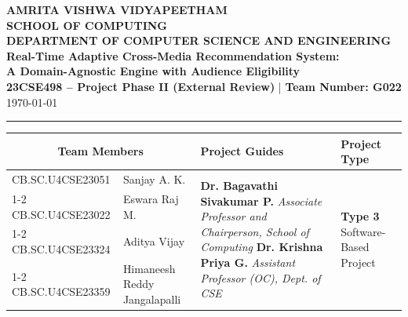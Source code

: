 \documentclass[11pt, a4paper]{article}
\begin{document}
\noindent
\begin{minipage}{\textwidth}
    \centering
    {\Large \textbf{\textcolor{amritaMaroon}{
    AMRITA VISHWA VIDYAPEETHAM \\
    SCHOOL OF COMPUTING \\
    DEPARTMENT OF COMPUTER SCIENCE AND ENGINEERING \\
    }}}
    \vspace{0.2cm}
    {\large \textbf{Real-Time Adaptive Cross-Media Recommendation System:\\ A Domain-Agnostic Engine with Audience Eligibility}} \\[0.1cm]
    \textbf{23CSE498 -- Project Phase II (External Review)} \quad | \quad \textbf{Team Number: G022} \\
    \today
\end{minipage}

\vspace{0.3cm}
\hrule
\vspace{0.3cm}

\noindent
\begin{center}
    \renewcommand{\arraystretch}{1.75}
    \setlength{\tabcolsep}{6pt}
    \begin{tabular}{|l|p{4.4cm}|p{5.1cm}|p{2.6cm}|}
        \hline
        \multicolumn{2}{|c|}{\textbf{Team Members}} & \textbf{Project Guides} & \textbf{Project Type} \\
        \hline
        \small CB.SC.U4CSE23051 & \small \raggedright Sanjay A. K. &
        \multirow{4}{=}{\raggedright \small \textbf{Dr. Bagavathi Sivakumar P.} \newline \textit{Associate Professor and Chairperson, School of Computing} \newline \textbf{Dr. Krishna Priya G.} \newline \textit{Assistant Professor (OC), Dept. of CSE}} &
        \multirow{4}{=}{\raggedright \small \textbf{Type 3} \newline Software-Based Project} \\ \cline{1-2}
        \small CB.SC.U4CSE23022 & \small Eswara Raj M. & & \\ \cline{1-2}
        \small CB.SC.U4CSE23324 & \small Aditya Vijay & & \\ \cline{1-2}
        \small CB.SC.U4CSE23359 & \small Himaneesh Reddy Jangalapalli & & \\
        \hline
    \end{tabular}
\end{center}
\vspace{0.2cm}
\end{document}
